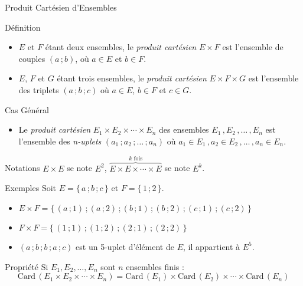 \documentclass{cours}
\begin{document}
    \begin{Gpartie}{Produit Cartésien d'Ensembles}
        \begin{Spartie}{Définition}
            \begin{itemize}
                \item $E$ et $F$ étant deux ensembles, le \emph{produit cartésien} $E\times F$ est l'ensemble de couples $(a\,; b)$, où $a\in E$ et $b\in F$.
                \item $E$, $F$ et $G$ étant trois ensembles, le \emph{produit cartésien} $E\times F\times G$ est l'ensemble des triplets $(a\,; b\,; c)$ où $a\in E$, $b\in F$ et $c\in G$.
            \end{itemize}
            \begin{SSpartie}{Cas Général}
                \begin{itemize}
                    \item Le \emph{produit cartésien} $E_1\times E_2\times\dotsb\times E_n$ des ensembles $E_1\,, E_2\,,\dotsc\,, E_n$ est l'ensemble des \emph{n-uplets} $(a_1\,; a_2\,;\dotsc\,; a_n)$ où $a_1\in E_1\,, a_2\in E_2\,,\dotsc\,, a_n\in E_n$.
                \end{itemize}
            \end{SSpartie}
        \end{Spartie}
        \begin{Spartie}{Notations}
            $E\times E$ se note $E^2$, $\overbrace{E\times E\times\dotsb\times E}^\text{$k$ fois}$ se note $E^k$.
        \end{Spartie}
        \begin{Spartie}{Exemples}
            Soit $E=\big\{\, a\,; b\,; c\,\big\}$ et $F=\big\{\,1\,; 2\,\big\}$.
            \begin{itemize}
                \item $E\times F=\big\{\,(a\,; 1)\,;(a\,; 2)\,; (b\,; 1)\,; (b\,; 2)\,; (c\,; 1)\,; (c\,; 2)\,\big\}$
                \item $F\times F=\big\{\,(1\,; 1)\,; (1\,; 2)\,; (2\,; 1)\,; (2\,; 2)\,\big\}$
                \item $(a\,; b\,; b\,; a\,; c)$ est un 5-uplet d'élément de $E$, il appartient à $E^5$.
            \end{itemize}
        \end{Spartie}
        \begin{Spartie}{Propriété}
            Si $E_1,E_2,\dotsc,E_n$ sont $n$ ensembles finis :
            \[\mathrm{Card}\,(E_1\times E_2\times\dotsb\times E_n)=\mathrm{Card}\,(E_1)\times\mathrm{Card}\,(E_2)\times\dotsb\times\mathrm{Card}\,(E_n)\]

\end{Spartie}
\end{Gpartie}
\end{document}
